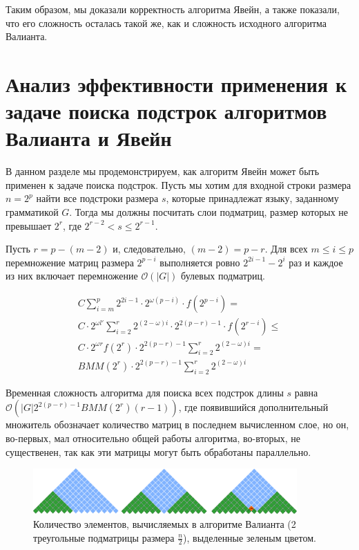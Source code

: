 Таким образом, мы доказали корректность алгоритма Явейн, а также показали, что его сложность осталась такой же, как и сложность исходного алгоритма Валианта.


\section{Анализ эффективности применения к задаче поиска подстрок алгоритмов Валианта и Явейн}

В данном разделе мы продемонстрируем, как алгоритм Явейн может быть применен к задаче поиска подстрок.
Пусть мы хотим для входной строки размера $n = 2^p$ найти все подстроки размера $s$, которые принадлежат языку, заданному грамматикой $G$.
Тогда мы должны посчитать слои подматриц, размер которых не превышает $2^{r}$, где $2^{r - 2} < s \le 2^{r - 1}$.

Пусть $r = p - (m - 2)$ и, следовательно, $(m - 2) = p - r$.
Для всех  $m \le i \le p$ перемножение матриц размера $2^{p - i}$ выполняется ровно $2^{2i - 1} - 2^{i}$ раз и каждое из них включает перемножение $\mathcal{O}(|G|)$ булевых подматриц.

\begin{equation*}
\begin{array}{c}
C \sum\limits_{i=m}^p 2^{2i - 1} \cdot 2^{\omega(p - i)} \cdot f(2^{p - i}) = \\
C \cdot 2^{\omega l'}\sum\limits_{i=2}^{r} 2^{(2 - \omega)i} \cdot 2^{2(p - r) - 1} \cdot f(2^{r - i}) \le \\
C \cdot 2^{\omega r} f(2^{r}) \cdot 2^{2(p - r) - 1} \sum\limits_{i=2}^{r} 2^{(2 - \omega)i} = \\
BMM(2^{r}) \cdot 2^{2(p - r) - 1} \sum\limits_{i=2}^{r} 2^{(2 - \omega)i}
\end{array}
\end{equation*}

Временная сложность алгоритма для поиска всех подстрок длины $s$ равна $\mathcal{O}(|G|2^{2(p - r) - 1}BMM(2^{r})(r - 1))$, где появившийся дополнительный множитель обозначает количество матриц в последнем вычисленном слое, но он, во-первых, мал относительно общей работы алгоритма, во-вторых, не существенен, так как эти матрицы могут быть обработаны параллельно.

\begin{figure}[h]
\vspace{3mm}
 \begin{center}
 \includegraphics[width=0.9\textwidth]{Susanina/pics/valsubstring.pdf}
    \caption{Количество элементов, вычисляемых в алгоритме Валианта (2  треугольные подматрицы размера $\frac{n}{2}$), выделенные зеленым цветом.}
    \label{fig5}
 \end{center}
\vspace{-8mm}
\end{figure}

